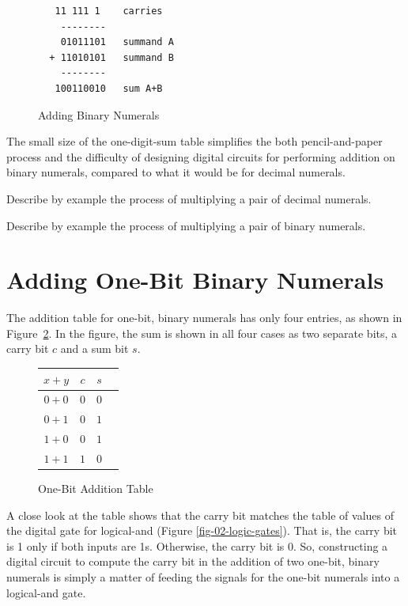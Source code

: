 \begin{figure}
\begin{lstlisting}
   11 111 1    carries
    --------
    01011101   summand A
  + 11010101   summand B
    --------
   100110010   sum A+B
\end{lstlisting}
\caption{Adding Binary Numerals}
\label{fig:adding-binary-numerals}
\end{figure}

The small size of the one-digit-sum table simplifies the
both pencil-and-paper process and the difficulty of designing
digital circuits for performing addition on binary numerals, compared to what
it would be for decimal numerals.

\begin{ExerciseList}
\Exercise Describe by example the process of multiplying a pair of decimal numerals.

\Exercise Describe by example the process of multiplying a pair of binary numerals.
\end{ExerciseList}

\section{Adding One-Bit Binary Numerals}
\label{sec:adding-1-bit-numerals}

The addition table for one-bit, binary numerals
has only four entries, as shown in
Figure~\ref{fig:1-bit-add-table}.
In the figure, the sum is shown in all four cases as two separate bits,
a carry bit $c$ and a sum bit $s$.

\begin{figure}
\begin{center}
\begin{tabular}{|c|c|c|c}
 \hline
 $x+y$  & $c$ & $s$ \\
 \hline
 $0+0$  & $0$ & $0$ \\
 \hline
 $0+1$  & $0$ & $1$ \\
 \hline
 $1+0$  & $0$ & $1$ \\
 \hline
 $1+1$  & $1$ & $0$ \\
 \hline
\end{tabular}
\end{center}
\caption{One-Bit Addition Table}
\label{fig:1-bit-add-table}
\end{figure}

A close look at the table shows that
the carry bit matches the table of values of the
digital gate for logical-and (Figure \ref{fig-02-logic-gates}).
That is, the carry bit is 1 only if both inputs are 1s.
Otherwise, the carry bit is 0.
So, constructing a digital circuit to compute the carry bit
in the addition of two one-bit, binary numerals is simply
a matter of feeding the signals for the one-bit numerals
into a logical-and gate.

